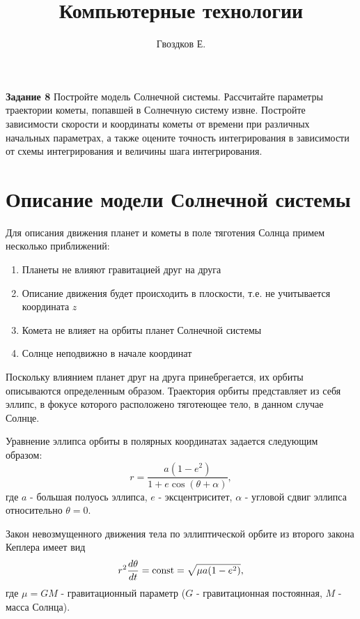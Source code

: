 



\title{Компьютерные технологии}
\author{Гвоздков Е.}


\maketitle

\textbf{Задание 8} Постройте модель Солнечной системы. Рассчитайте параметры траектории кометы,
попавшей в Солнечную систему извне. Постройте зависимости скорости и координаты кометы
от времени при различных начальных параметрах, а также оцените точность интегрирования в
зависимости от схемы интегрирования и величины шага интегрирования.

\section{Описание модели Солнечной системы}
Для описания движения планет и кометы в поле тяготения Солнца примем несколько приближений:
\begin{enumerate}
	\item Планеты не влияют гравитацией друг на друга
	\item Описание движения будет происходить в плоскости, т.е. не учитывается координата $z$
	\item Комета не влияет на орбиты планет Солнечной системы
	\item Солнце неподвижно в начале координат
\end{enumerate}
Поскольку влиянием планет друг на друга принебрегается, их орбиты описываются определенным образом.
Траектория орбиты представляет из себя эллипс, в фокусе которого расположено тяготеющее тело, в данном случае Солнце.

Уравнение эллипса орбиты в полярных координатах задается следующим образом:
\begin{equation}
	r = \frac{a(1-e^2)}{1 + e \cos(\theta + \alpha)},
\end{equation}
где $a$ - большая полуось эллипса, $e$ - эксцентриситет, $\alpha$ - угловой сдвиг
эллипса относительно $\theta=0$.

Закон невозмущенного движения тела по эллиптической орбите из второго закона Кеплера имеет вид
\begin{equation}
	r^2\frac{d\theta}{d t} = \text{\rmfamily\upshape const} = \sqrt{\mu a (1-e^2)},
\end{equation}
где $\mu = GM$ - гравитационный параметр ($G$ - гравитационная постоянная, $M$ - масса Солнца).

